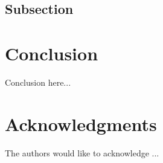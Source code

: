 \documentclass[a4paper,fleqn]{cas-sc}
\begin{document}
\subsection{Subsection}


\section{Conclusion}

Conclusion here...

\section{Acknowledgments}

The authors would like to acknowledge ...

\printcredits


 
\end{document}
